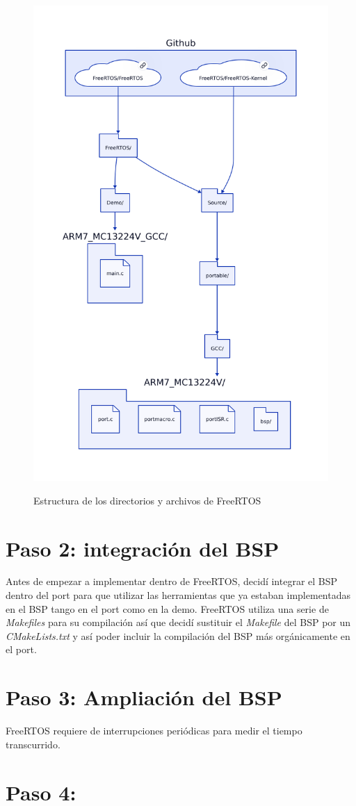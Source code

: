 \begin{figure}%
\centering
\includegraphics[width=\textwidth]{img/carpetasFreeRTOS.png}
\label{fig:DirsFreeRTOS}
\caption{Estructura de los directorios y archivos de FreeRTOS}
\end{figure}

\section{Paso 2: integración del BSP}
Antes de empezar a implementar dentro de FreeRTOS, decidí integrar el BSP dentro del port para que utilizar las herramientas que ya estaban implementadas en el BSP tango en el port como en la demo.
FreeRTOS utiliza una serie de \textit{Makefiles} para su compilación así que decidí sustituir el \textit{Makefile} del BSP por un \textit{CMakeLists.txt} y así poder incluir la compilación del BSP más orgánicamente en el port.

\section{Paso 3: Ampliación del BSP}
FreeRTOS requiere de interrupciones periódicas para medir el tiempo transcurrido.

\section{Paso 4: }

